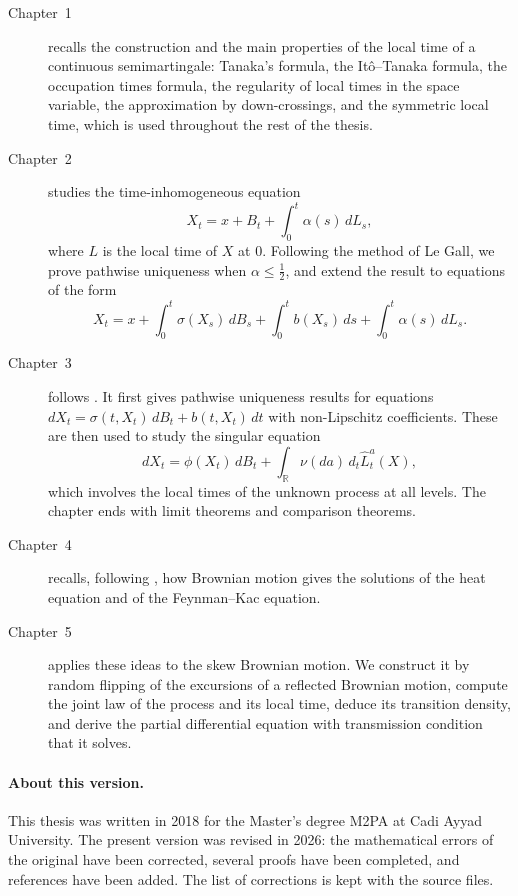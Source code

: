 \begin{description}
	\item[Chapter~1] recalls the construction and the main properties of the
	      local time of a continuous semimartingale: Tanaka's formula, the
	      Itô--Tanaka formula, the occupation times formula, the regularity of
	      local times in the space variable, the approximation by down-crossings,
	      and the symmetric local time, which is used throughout the rest of the
	      thesis.
	\item[Chapter~2] studies the time-inhomogeneous equation
	      \[
		      X_t = x + B_t + \int_0^t \alpha(s)\,dL_s ,
	      \]
	      where $L$ is the local time of $X$ at $0$. Following the method of Le
	      Gall, we prove pathwise uniqueness when $\alpha\leqslant\frac12$, and
	      extend the result to equations of the form
	      \[
		      X_t = x + \int_0^t \sigma(X_s)\,dB_s + \int_0^t b(X_s)\,ds + \int_0^t \alpha(s)\,dL_s .
	      \]
	\item[Chapter~3] follows \citet{LeGall1984}. It first gives pathwise
	      uniqueness results for equations $dX_t = \sigma(t,X_t)\,dB_t + b(t,X_t)\,dt$
	      with non-Lipschitz coefficients. These are then used to study the
	      singular equation
	      \[
		      dX_t = \phi(X_t)\,dB_t + \int_{\mathbb{R}} \nu(da)\,d_t\hat{L}^a_t(X),
	      \]
	      which involves the local times of the unknown process at all levels.
	      The chapter ends with limit theorems and comparison theorems.
	\item[Chapter~4] recalls, following \citet{Durrett1996}, how Brownian
	      motion gives the solutions of the heat equation and of the
	      Feynman--Kac equation.
	\item[Chapter~5] applies these ideas to the skew Brownian motion. We
	      construct it by random flipping of the excursions of a reflected
	      Brownian motion, compute the joint law of the process and its local
	      time, deduce its transition density, and derive the partial
	      differential equation with transmission condition that it solves.
\end{description}

\paragraph{About this version.} This thesis was written in 2018 for the
Master's degree M2PA at Cadi Ayyad University. The present version was
revised in 2026: the mathematical errors of the original have been
corrected, several proofs have been completed, and references have been
added. The list of corrections is kept with the source files.
